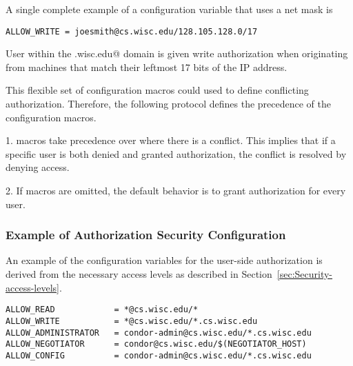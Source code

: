 A single complete example of a configuration variable that uses
a net mask is
\footnotesize
\begin{verbatim}
ALLOW_WRITE = joesmith@cs.wisc.edu/128.105.128.0/17
\end{verbatim}
\normalsize
User \verb@joesmith@ within the
\verb@cs.wisc.edu@ domain is given write authorization
when originating from machines that match their leftmost
17 bits of the IP address.

This flexible set of configuration macros could used to define
conflicting authorization.
Therefore, the following protocol defines the precedence of the
configuration macros.
\begin{description}
\item{1. } macros take precedence over 
where there is a conflict.
This implies that if a specific user is both denied and granted authorization,
the conflict is resolved by denying access.
\item{2. }If macros are omitted, the default behavior is to grant
authorization for every user.
\end{description}
\subsubsection{\label{sec:Security-sample2} Example of Authorization Security Configuration}

An example of the configuration variables for the user-side
authorization is derived from the necessary access levels
as described in
Section~\ref{sec:Security-access-levels}.

\footnotesize
\begin{verbatim}
ALLOW_READ            = *@cs.wisc.edu/*
ALLOW_WRITE           = *@cs.wisc.edu/*.cs.wisc.edu
ALLOW_ADMINISTRATOR   = condor-admin@cs.wisc.edu/*.cs.wisc.edu
ALLOW_NEGOTIATOR      = condor@cs.wisc.edu/$(NEGOTIATOR_HOST)
ALLOW_CONFIG          = condor-admin@cs.wisc.edu/*.cs.wisc.edu
\end{verbatim}
\normalsize

